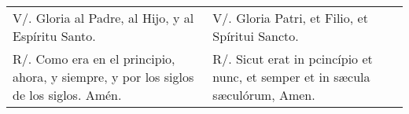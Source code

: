 \documentclass[../devocionario.tex]{subfiles}
\begin{document}
    \begin{longtable} { p{} p{} }
        V/. Gloria al Padre, al Hijo, y al Espíritu Santo. &
        V/. Gloria Patri, et Filio, et Spíritui Sancto.\\
        
        R/. Como era en el principio, ahora, y siempre, y por los siglos de los siglos. Amén. &
        R/. Sicut erat in pcincípio et nunc, et semper et in sæcula sæculórum, Amen.
    \end{longtable}
\end{document}
